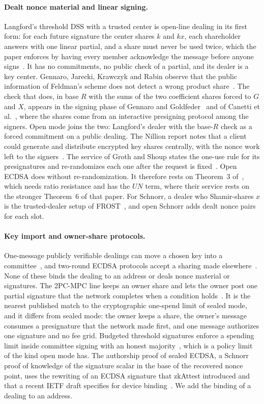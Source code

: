 \paragraph{Dealt nonce material and linear signing.} Langford's threshold DSS with a trusted center is open-line dealing in its first form: for each future signature the center shares $k$ and $kx$, each shareholder answers with one linear partial, and a share must never be used twice, which the paper enforces by having every member acknowledge the message before anyone signs~\cite{Lan95}. It has no commitments, no public check of a partial, and its dealer is a key center. Gennaro, Jarecki, Krawczyk and Rabin observe that the public information of Feldman's scheme does not detect a wrong product share~\cite{GJKR96}. The check that does, in base $R$ with the sums of the two coefficient shares forced to $G$ and $X$, appears in the signing phase of Gennaro and Goldfeder~\cite{GG20} and of Canetti et al.~\cite{CGGMP21}, where the shares come from an interactive presigning protocol among the signers. Open mode joins the two: Langford's dealer with the base-$R$ check as a forced commitment on a public dealing. The Nillion report notes that a client could generate and distribute encrypted key shares centrally, with the nonce work left to the signers~\cite{Nillion23}. The service of Groth and Shoup states the one-use rule for its presignatures and re-randomizes each one after the request is fixed~\cite{GS22}. Open ECDSA does without re-randomization. It therefore rests on Theorem~3 of~\cite{GS21}, which needs ratio resistance and has the $UN$ term, where their service rests on the stronger Theorem~6 of that paper. For Schnorr, a dealer who Shamir-shares $x$ is the trusted-dealer setup of FROST~\cite{FROST,RFC9591}, and open Schnorr adds dealt nonce pairs for each slot.

\paragraph{Key import and owner-share protocols.} One-message publicly verifiable dealings can move a chosen key into a committee~\cite{cgVSS,Groth21}, and two-round ECDSA protocols accept a sharing made elsewhere~\cite{TroutPP,LLZD25}. None of these binds the dealing to an address or deals nonce material or signatures. The 2PC-MPC line keeps an owner share and lets the owner post one partial signature that the network completes when a condition holds~\cite{TwoPCMPC,FMMSS25,IkaDocs}. It is the nearest published match to the cryptographic one-spend limit of sealed mode, and it differs from sealed mode: the owner keeps a share, the owner's message consumes a presignature that the network made first, and one message authorizes one signature and no fee grid. Budgeted threshold signatures enforce a spending limit inside committee signing with an honest majority~\cite{CZC26}, which is a policy limit of the kind open mode has. The authorship proof of sealed ECDSA, a Schnorr proof of knowledge of the signature scalar in the base of the recovered nonce point, uses the rewriting of an ECDSA signature that zkAttest introduced and that a recent IETF draft specifies for device binding~\cite{zkAttestBlog,CLLZ26}. We add the binding of a dealing to an address.

